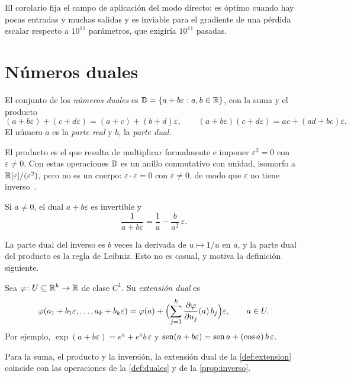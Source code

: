 El corolario fija el campo de aplicación del modo directo: es óptimo cuando hay pocas entradas y muchas salidas y es inviable para el gradiente de una pérdida escalar respecto a $10^{11}$ parámetros, que exigiría $10^{11}$ pasadas.

\section{Números duales}

\begin{definicion}\label{def:duales}
El conjunto de los \emph{números duales} es $\mathbb{D}=\{a+b\varepsilon : a,b\in\mathbb{R}\}$, con la suma y el producto
\[
(a+b\varepsilon)+(c+d\varepsilon)=(a+c)+(b+d)\varepsilon,\qquad
(a+b\varepsilon)(c+d\varepsilon)=ac+(ad+bc)\varepsilon .
\]
El número $a$ es la \emph{parte real} y $b$, la \emph{parte dual}.
\end{definicion}

El producto es el que resulta de multiplicar formalmente e imponer $\varepsilon^{2}=0$ con $\varepsilon\ne 0$. Con estas operaciones $\mathbb{D}$ es un anillo conmutativo con unidad, isomorfo a $\mathbb{R}[\varepsilon]/(\varepsilon^{2})$, pero no es un cuerpo: $\varepsilon\cdot\varepsilon=0$ con $\varepsilon\ne 0$, de modo que $\varepsilon$ no tiene inverso~\cite[§3.1.1]{baydin}.

\begin{proposicion}\label{prop:inverso}
Si $a\ne 0$, el dual $a+b\varepsilon$ es invertible y
\[
\frac{1}{a+b\varepsilon}=\frac1a-\frac{b}{a^{2}}\,\varepsilon .
\]
\end{proposicion}

La parte dual del inverso es $b$ veces la derivada de $u\mapsto 1/u$ en $a$, y la parte dual del producto es la regla de Leibniz. Esto no es casual, y motiva la definición siguiente.

\begin{definicion}\label{def:extension}
Sea $\varphi\colon U\subseteq\mathbb{R}^{k}\to\mathbb{R}$ de clase $C^{1}$. Su \emph{extensión dual} es
\[
\varphi(a_1+b_1\varepsilon,\dots,a_k+b_k\varepsilon)=\varphi(a)+\Bigl(\sum_{j=1}^{k}\frac{\partial\varphi}{\partial u_j}(a)\,b_j\Bigr)\varepsilon ,\qquad a\in U.
\]
Por ejemplo, $\exp(a+b\varepsilon)=e^{a}+e^{a}b\,\varepsilon$ y $\operatorname{sen}(a+b\varepsilon)=\operatorname{sen} a+(\cos a)\,b\,\varepsilon$.
\end{definicion}

\begin{proposicion}\label{prop:coherencia}
Para la suma, el producto y la inversión, la extensión dual de la \cref{def:extension} coincide con las operaciones de la \cref{def:duales} y de la \cref{prop:inverso}.
\end{proposicion}

